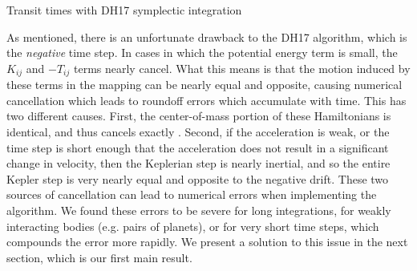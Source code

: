 \documentclass[fleqn,usenatbib,twocolumn]{mnras}
\begin{document}
\begin{algorithm}
 \caption{Transit times with DH17 symplectic integration}
 \label{alg:DH17_algorithm}
\end{algorithm}

As mentioned, there is an unfortunate drawback to the DH17 algorithm, which is
the \emph{negative} time step.  In cases in which the potential
energy term is small, the $K_{ij}$ and $-T_{ij}$ terms nearly
cancel.  What this means is that the motion induced by these
terms in the mapping can be nearly equal and opposite, causing
numerical cancellation which leads to roundoff
errors which accumulate with time.  This has two different causes.
First, the center-of-mass portion of
these Hamiltonians is identical, and thus cancels exactly
\citep{Dehnen2017}.  Second, if
the acceleration is weak, or the time step is short enough
that the acceleration does not result in a significant change
in velocity, then the Keplerian step is nearly inertial, and
so the entire Kepler step is very nearly equal and opposite to
the negative drift.  These two sources of cancellation can
lead to numerical errors when implementing the algorithm.
We found these errors to be
severe for long integrations, for weakly interacting bodies (e.g.
pairs of planets), or for very short time steps, which compounds
the error more rapidly.  We present a solution to this
issue in the next section, which is our first main result.
\end{document}
